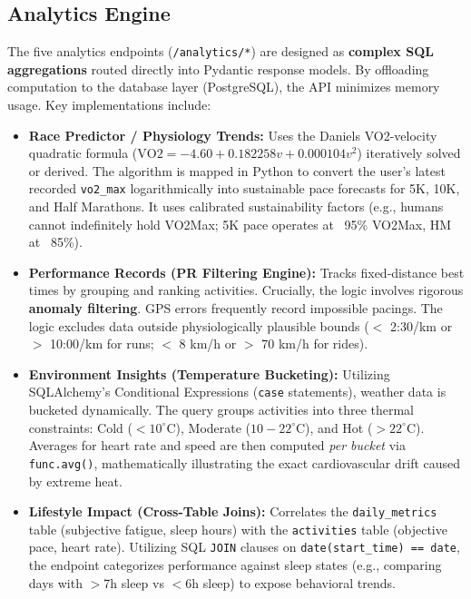 \documentclass[10pt,a4paper]{article}
\begin{document}
\subsection{Analytics Engine}

The five analytics endpoints (\texttt{/analytics/*}) are designed as \textbf{complex SQL aggregations} routed directly into Pydantic response models. By offloading computation to the database layer (PostgreSQL), the API minimizes memory usage. Key implementations include:

\begin{itemize}[leftmargin=1.5em]
  \item \textbf{Race Predictor / Physiology Trends:} Uses the Daniels VO2-velocity quadratic formula ($\mathrm{VO2} = -4.60 + 0.182258v + 0.000104v^2$) iteratively solved or derived. The algorithm is mapped in Python to convert the user's latest recorded \texttt{vo2\_max} logarithmically into sustainable pace forecasts for 5K, 10K, and Half Marathons. It uses calibrated sustainability factors (e.g., humans cannot indefinitely hold VO2Max; 5K pace operates at ~95\% VO2Max, HM at ~85\%).
  \item \textbf{Performance Records (PR Filtering Engine):} Tracks fixed-distance best times by grouping and ranking activities. Crucially, the logic involves rigorous \textbf{anomaly filtering}. GPS errors frequently record impossible pacings. The logic excludes data outside physiologically plausible bounds ($<$ 2:30/km or $>$ 10:00/km for runs; $<$ 8 km/h or $>$ 70 km/h for rides).
  \item \textbf{Environment Insights (Temperature Bucketing):} Utilizing SQLAlchemy's Conditional Expressions (\texttt{case} statements), weather data is bucketed dynamically. The query groups activities into three thermal constraints: Cold ($<10^\circ$C), Moderate ($10-22^\circ$C), and Hot ($>22^\circ$C). Averages for heart rate and speed are then computed \textit{per bucket} via \texttt{func.avg()}, mathematically illustrating the exact cardiovascular drift caused by extreme heat.
  \item \textbf{Lifestyle Impact (Cross-Table Joins):} Correlates the \texttt{daily\_metrics} table (subjective fatigue, sleep hours) with the \texttt{activities} table (objective pace, heart rate). Utilizing SQL \texttt{JOIN} clauses on \texttt{date(start\_time) == date}, the endpoint categorizes performance against sleep states (e.g., comparing days with $>$7h sleep vs $<$6h sleep) to expose behavioral trends.
\end{itemize}
\end{document}
